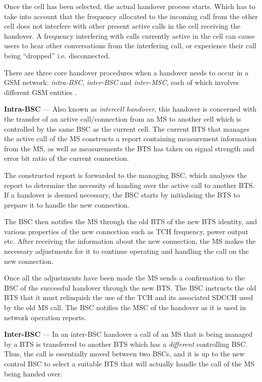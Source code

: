 Once the cell has been selected, the actual handover process starts. Which has to take into account that the frequency allocated to the incoming call from the other cell does not interfere with other present active calls in the cell receiving the handover\cite{Eisenblatter,GSMArchitectureProtocolsServices,wirelesstelcoMullet}. A frequency interfering with calls currently active in the cell can cause users to hear other conversations from the interfering call, or experience their call being ``dropped'' i.e. disconnected\cite{Eisenblatter}. 

There are three core handover procedures when a handover needs to occur in a GSM network: \emph{intra-BSC}, \emph{inter-BSC} and \emph{inter-MSC}, each of which involves different GSM entities \cite{wirelesstelcoMullet}.

\begin{description}
\item{\textbf{Intra-BSC}} --- Also known as \emph{intercell handover}, this handover is concerned with the transfer of an active call/connection from an MS to another cell which is controlled by the same BSC as the current cell. The current BTS that manages the active call of the MS constructs a report containing measurement information from the MS, as well as measurements the BTS has taken on signal strength and error bit ratio of the current connection\cite{wirelesstelcoMullet,GSMArchitectureProtocolsServices}. 

The constructed report is forwarded to the managing BSC, which analyses the report to determine the necessity of handing over the active call to another BTS. If a handover is deemed necessary, the BSC starts by initialising the BTS to prepare it to handle the new connection\cite{wirelesstelcoMullet,GSMArchitectureProtocolsServices}.

The BSC then notifies the MS through the old BTS of the new BTS identity, and various properties of the new connection such as TCH frequency, power output etc. After receiving the information about the new connection, the MS makes the necessary adjustments for it to continue operating and handling the call on the new connection\cite{wirelesstelcoMullet,GSMArchitectureProtocolsServices}. 

Once all the adjustments have been made the MS sends a confirmation to the BSC of the successful handover through the new BTS. The BSC instructs the old BTS that it must relinquish the use of the TCH and its associated SDCCH used by the old MS call. The BSC notifies the MSC of the handover as it is used in network operation reports\cite{wirelesstelcoMullet,GSMArchitectureProtocolsServices}.
\item{\textbf{Inter-BSC}} --- In an inter-BSC handover a call of an MS that is being managed by a BTS is transferred to another BTS which has a \emph{different} controlling BSC. Thus, the call is essentially moved between two BSCs, and it is up to the new control BSC to select a suitable BTS that will actually handle the call of the MS being handed over\cite{wirelesstelcoMullet,GSMArchitectureProtocolsServices}.


\end{description}
